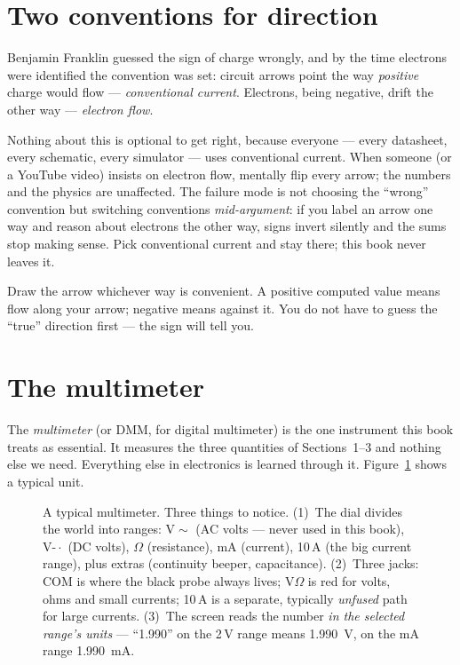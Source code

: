 \section{Two conventions for direction}
\label{sec:conventions}

Benjamin Franklin guessed the sign of charge wrongly, and by the time electrons
were identified the convention was set: circuit arrows point the way
\emph{positive} charge would flow — \emph{conventional
current}. Electrons, being negative, drift
the other way — \emph{electron flow}.

Nothing about this is optional to get right, because everyone — every
datasheet, every schematic, every simulator — uses conventional current. When
someone (or a YouTube video) insists on electron flow, mentally flip every
arrow; the numbers and the physics are unaffected. The failure mode is not
choosing the ``wrong'' convention but switching conventions
\emph{mid-argument}: if you label an arrow one way and reason about electrons
the other way, signs invert silently and the sums stop making sense. Pick
conventional current and stay there; this book never leaves it.

\begin{principle}
Draw the arrow whichever way is convenient. A positive computed value means
flow along your arrow; negative means against it. You do not have to guess the
``true'' direction first — the sign will tell you.
\end{principle}

\section{The multimeter}
\label{sec:dmm}

The \emph{multimeter} (or DMM, for digital
multimeter) is the one instrument this book treats as essential. It measures
the three quantities of Sections~1--3 and nothing else we need. Everything else
in electronics is learned through it. Figure~\ref{fig:dmm} shows a typical
unit.

\begin{figure}[htbp]
\centering

\caption{A typical multimeter. Three things to notice. (1)~The dial divides the
world into ranges: $\mathrm{V}\!\sim$ (AC volts — never used in this book),
$\mathrm{V}\!\text{-}\!\!\cdot$ (DC volts), $\Omega$ (resistance), mA (current),
10\,A (the big current range), plus extras (continuity beeper, capacitance).
(2)~Three jacks: COM is where the black probe always lives; V$\Omega$ is red for
volts, ohms and small currents; 10\,A is a separate, typically \emph{unfused}
path for large currents. (3)~The screen reads the number \emph{in the selected range's units} —
``1.990'' on the 2\,V range means \qty{1.990}{\volt}, on the mA range
\qty{1.990}{\milli\ampere}.}
\label{fig:dmm}
\end{figure}

